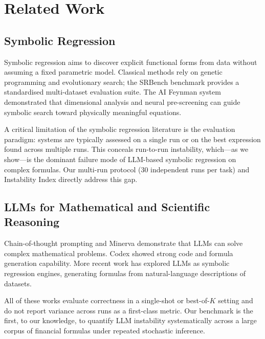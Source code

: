 \documentclass[twoside,11pt]{article}
\begin{document}
\section{Related Work}
\label{sec:related}

\subsection{Symbolic Regression}\label{subsec:symbolic-regression}
\label{sec:related_sr}

Symbolic regression aims to discover explicit functional forms from data without
assuming a fixed parametric model.  Classical methods rely on genetic programming
\citep{koza1992genetic} and evolutionary search; the SRBench benchmark \citep{lacava2021contemporary}
provides a standardised multi-dataset evaluation suite.  The AI Feynman
system \citep{udrescu2020ai} demonstrated that dimensional analysis and neural
pre-screening can guide symbolic search toward physically meaningful equations.

A critical limitation of the symbolic regression literature is the evaluation
paradigm: systems are typically assessed on a single run or on the best expression
found across multiple runs.  This conceals run-to-run instability, which---as we
show---is the dominant failure mode of LLM-based symbolic regression on complex
formulas.  Our multi-run protocol (30 independent runs per task) and Instability
Index directly address this gap.

\subsection{LLMs for Mathematical and Scientific Reasoning}\label{subsec:llms-for-mathematical-and-scientific-rea}
\label{sec:related_llm}

Chain-of-thought prompting \citep{wei2022chain} and Minerva \citep{lewkowycz2022minerva}
demonstrate that LLMs can solve complex mathematical problems.  Codex \citep{chen2021evaluating}
showed strong code and formula generation capability.  More recent work has explored
LLMs as symbolic regression engines, generating formulas from natural-language
descriptions of datasets.

All of these works evaluate correctness in a single-shot or best-of-$K$ setting and
do not report variance across runs as a first-class metric.  Our benchmark is the
first, to our knowledge, to quantify LLM instability systematically across a large
corpus of financial formulas under repeated stochastic inference.
\end{document}
